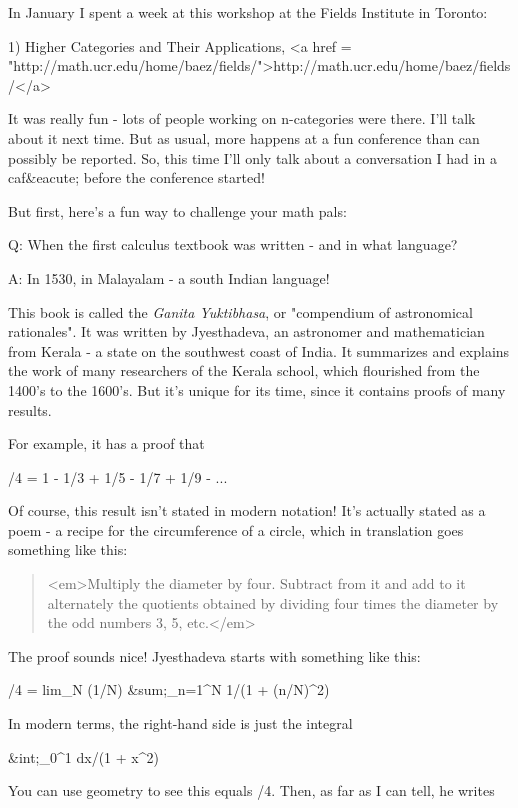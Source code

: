 


In January I spent a week at this workshop at the Fields Institute
in Toronto:

1) Higher Categories and Their Applications, <a href =
"http://math.ucr.edu/home/baez/fields/">http://math.ucr.edu/home/baez/fields/</a>

It was really fun - lots of people working on n-categories were there.
I'll talk about it next time.  But as usual, more happens at a fun
conference than can possibly be reported.  So, this time I'll only
talk about a conversation I had in a caf&eacute; before the conference
started!

But first, here's a fun way to challenge your math pals:

Q: When the first calculus textbook was written - and in what 
language?

A: In 1530, in Malayalam - a south Indian language!  

This book is called the \emph{Ganita Yuktibhasa}, or
"compendium of astronomical rationales".  It was written by
Jyesthadeva, an astronomer and mathematician from Kerala - a state on
the southwest coast of India.  It summarizes and explains the work of
many researchers of the Kerala school, which flourished from the
1400's to the 1600's.  But it's unique for its time, since it contains
proofs of many results.

For example, it has a proof that

\pi /4 = 1 - 1/3 + 1/5 - 1/7 + 1/9 - ...

Of course, this result isn't stated in modern notation!  It's
actually stated as a poem - a recipe for the circumference of 
a circle, which in translation goes something like this:

\begin{quote}
 <em>Multiply the diameter by four.  Subtract from it and add to it
 alternately the quotients obtained by dividing four times the 
 diameter by the odd numbers 3, 5, etc.</em>
\end{quote}

The proof sounds nice!  Jyesthadeva starts with something like this:

\pi /4 = lim_{N \to  \infty } (1/N) &sum;_{n=1}^{N} 1/(1 + (n/N)^{2})

In modern terms, the right-hand side is just the integral

&int;_{0}^{1} dx/(1 + x^{2}) 
 
You can use geometry to see this equals \pi /4.  Then, as far as 
I can tell, he writes

